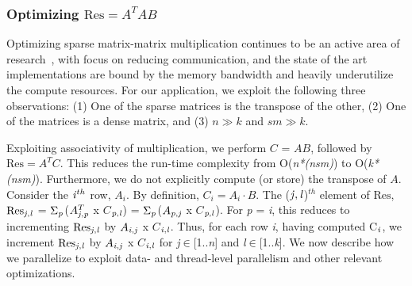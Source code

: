 \vspace*{0.05in} 
\subsubsection{Optimizing $\mathrm{Res}=A^TAB$}
    Optimizing sparse matrix-matrix  multiplication continues to be an
    active area of research~\cite{ballard13,patwary15}, with focus on
    reducing communication, and the state of the art implementations
    are bound by the memory bandwidth and heavily
    underutilize the compute resources. 
    For our application, we exploit the following three observations:
    (1) One of the sparse matrices is the transpose of the other,   
    (2) One of the matrices is a dense matrix,   and    %
    (3) $n \gg k$ and $sm \gg k$.

    Exploiting associativity of multiplication, we perform $C$ = $AB$, 
    followed by $\mathrm{Res} = A^TC$. This reduces the run-time complexity from
    O({\it{n*(nsm)}}) to O({\it{k*(nsm)}}). Furthermore, we do not
    explicitly compute (or store) the transpose of $A$.  Consider the
    ${\it{i}}^{th}$ row, $A_i$. 
    By definition,  $C_i = A_i \cdot B$.
    The (${\it{j}},{\it{l}}$)$^{th}$ element of $\mathrm{Res}$,
    $\mathrm{Res}_{{\it{j}},{\it{l}}}$ =
    $\Sigma_{\it{p}}$($A^T_{{\it{j}},{\it{p}}}$ x $C$$_{{\it{p}},{\it{l}}}$) = 
    $\Sigma_{\it{p}}$($A_{{\it{p}},{\it{j}}}$ x
    $C$$_{{\it{p}},{\it{l}}}$).
    For {\it{p}} = {\it{i}}, this reduces to incrementing
    $\mathrm{Res}_{{\it{j}},{\it{l}}}$ by $A_{{\it{i}},{\it{j}}}$ x
    $C$$_{{\it{i}},{\it{l}}}$. 
    Thus, for each row {\it{i}}, 
    having computed C$_{\it{i}}$, we
    increment $\mathrm{Res}_{{\it{j}},{\it{l}}}$ 
    by $A_{{\it{i}},{\it{j}}}$ x $C$$_{{\it{i}},{\it{l}}}$
    for {\it{j}}$\in$[1..{\it{n}}] and {\it{l}}$\in$[1..{\it{k}}].
     We now describe how we parallelize  to exploit
     data- and thread-level parallelism and other relevant
     optimizations.





